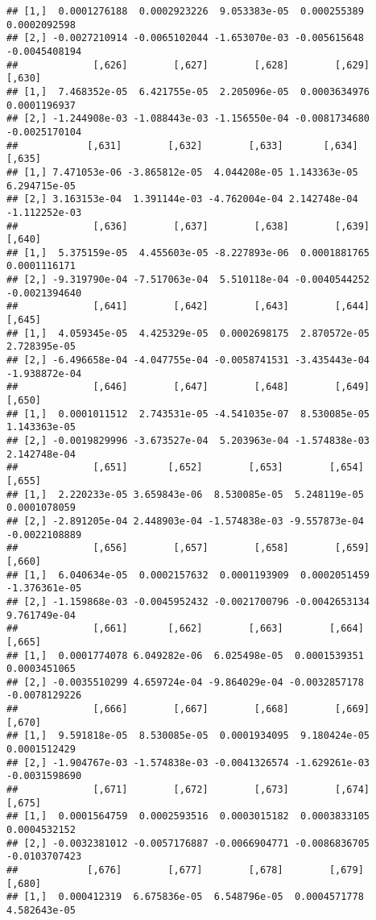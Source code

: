 \documentclass[
]{article}
\begin{document}
\begin{verbatim}
## [1,]  0.0001276188  0.0002923226  9.053383e-05  0.000255389  0.0002092598
## [2,] -0.0027210914 -0.0065102044 -1.653070e-03 -0.005615648 -0.0045408194
##             [,626]        [,627]        [,628]        [,629]        [,630]
## [1,]  7.468352e-05  6.421755e-05  2.205096e-05  0.0003634976  0.0001196937
## [2,] -1.244908e-03 -1.088443e-03 -1.156550e-04 -0.0081734680 -0.0025170104
##            [,631]        [,632]        [,633]       [,634]        [,635]
## [1,] 7.471053e-06 -3.865812e-05  4.044208e-05 1.143363e-05  6.294715e-05
## [2,] 3.163153e-04  1.391144e-03 -4.762004e-04 2.142748e-04 -1.112252e-03
##             [,636]        [,637]        [,638]        [,639]        [,640]
## [1,]  5.375159e-05  4.455603e-05 -8.227893e-06  0.0001881765  0.0001116171
## [2,] -9.319790e-04 -7.517063e-04  5.510118e-04 -0.0040544252 -0.0021394640
##             [,641]        [,642]        [,643]        [,644]        [,645]
## [1,]  4.059345e-05  4.425329e-05  0.0002698175  2.870572e-05  2.728395e-05
## [2,] -6.496658e-04 -4.047755e-04 -0.0058741531 -3.435443e-04 -1.938872e-04
##             [,646]        [,647]        [,648]        [,649]       [,650]
## [1,]  0.0001011512  2.743531e-05 -4.541035e-07  8.530085e-05 1.143363e-05
## [2,] -0.0019829996 -3.673527e-04  5.203963e-04 -1.574838e-03 2.142748e-04
##             [,651]       [,652]        [,653]        [,654]        [,655]
## [1,]  2.220233e-05 3.659843e-06  8.530085e-05  5.248119e-05  0.0001078059
## [2,] -2.891205e-04 2.448903e-04 -1.574838e-03 -9.557873e-04 -0.0022108889
##             [,656]        [,657]        [,658]        [,659]        [,660]
## [1,]  6.040634e-05  0.0002157632  0.0001193909  0.0002051459 -1.376361e-05
## [2,] -1.159868e-03 -0.0045952432 -0.0021700796 -0.0042653134  9.761749e-04
##             [,661]       [,662]        [,663]        [,664]        [,665]
## [1,]  0.0001774078 6.049282e-06  6.025498e-05  0.0001539351  0.0003451065
## [2,] -0.0035510299 4.659724e-04 -9.864029e-04 -0.0032857178 -0.0078129226
##             [,666]        [,667]        [,668]        [,669]        [,670]
## [1,]  9.591818e-05  8.530085e-05  0.0001934095  9.180424e-05  0.0001512429
## [2,] -1.904767e-03 -1.574838e-03 -0.0041326574 -1.629261e-03 -0.0031598690
##             [,671]        [,672]        [,673]        [,674]        [,675]
## [1,]  0.0001564759  0.0002593516  0.0003015182  0.0003833105  0.0004532152
## [2,] -0.0032381012 -0.0057176887 -0.0066904771 -0.0086836705 -0.0103707423
##            [,676]        [,677]        [,678]        [,679]        [,680]
## [1,]  0.000412319  6.675836e-05  6.548796e-05  0.0004571778  4.582643e-05

\end{verbatim}
\end{document}

